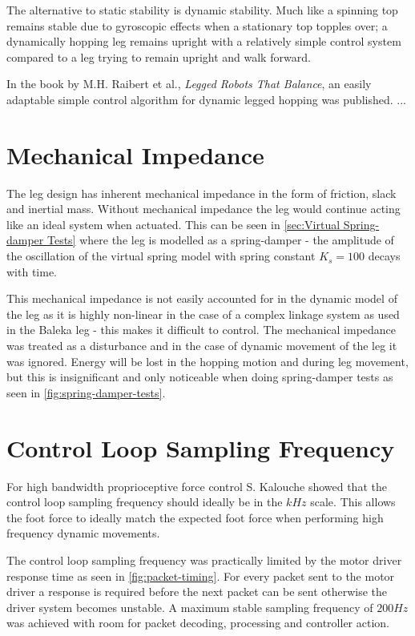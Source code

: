 The alternative to static stability is dynamic stability. Much like a spinning top remains stable due to gyroscopic effects when a stationary top topples over; a dynamically hopping leg remains upright with a relatively simple control system compared to a leg trying to remain upright and walk forward.

In the book by  M.H. Raibert et al., \textit{Legged Robots That Balance}, an easily adaptable simple control algorithm for dynamic legged hopping was published. ...

\section{Mechanical Impedance}
The leg design has inherent mechanical impedance in the form of friction, slack and inertial mass. Without mechanical impedance the leg would continue acting like an ideal system when actuated. This can be seen in \cref{sec:Virtual Spring-damper Tests} where the leg is modelled as a spring-damper - the amplitude of the oscillation of the virtual spring model with spring constant $K_s = 100$ decays with time. 

This mechanical impedance is not easily accounted for in the dynamic model of the leg as it is highly non-linear in the case of a complex linkage system as used in the Baleka leg - this makes it difficult to control. The mechanical impedance was treated as a disturbance and in the case of dynamic movement of the leg it was ignored. Energy will be lost in the hopping motion and during leg movement, but this is insignificant and only noticeable when doing spring-damper tests as seen in \cref{fig:spring-damper-tests}.

\section{Control Loop Sampling Frequency}

For high bandwidth proprioceptive force control S. Kalouche showed that the control loop sampling frequency should ideally be in the $kHz$ scale.\cite{Kalouche2016} This allows the foot force to ideally match the expected foot force when performing high frequency dynamic movements. 

The control loop sampling frequency was practically limited by the motor driver response time as seen in \cref{fig:packet-timing}. For every packet sent to the motor driver a response is required before the next packet can be sent otherwise the driver system becomes unstable. A maximum stable sampling frequency of $200 Hz$ was achieved with room for packet decoding, processing and controller action.

